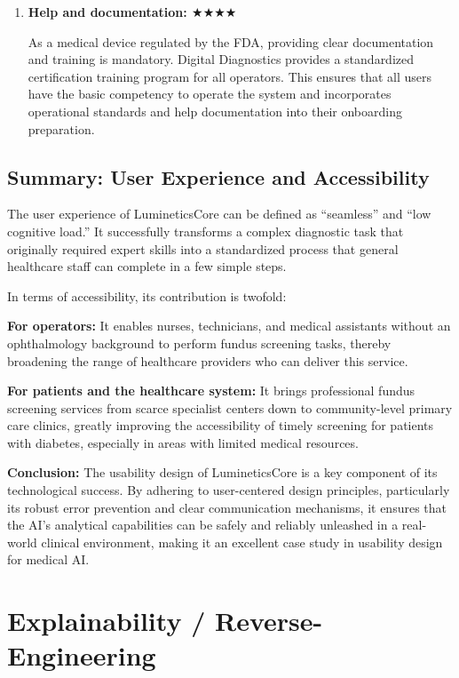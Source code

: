 \documentclass[sigplan,screen]{acmart}
\begin{document}
\begin{enumerate}
\item \textbf{Help and documentation: $\bigstar\bigstar\bigstar\bigstar$}

As a medical device regulated by the FDA, providing clear documentation and training is mandatory. Digital Diagnostics provides a standardized certification training program for all operators. This ensures that all users have the basic competency to operate the system and incorporates operational standards and help documentation into their onboarding preparation.

\end{enumerate}

\subsection{Summary: User Experience and Accessibility}

The user experience of LumineticsCore can be defined as ``seamless'' and ``low cognitive load.'' It successfully transforms a complex diagnostic task that originally required expert skills into a standardized process that general healthcare staff can complete in a few simple steps.

In terms of accessibility, its contribution is twofold:

\textbf{For operators:} It enables nurses, technicians, and medical assistants without an ophthalmology background to perform fundus screening tasks, thereby broadening the range of healthcare providers who can deliver this service.

\textbf{For patients and the healthcare system:} It brings professional fundus screening services from scarce specialist centers down to community-level primary care clinics, greatly improving the accessibility of timely screening for patients with diabetes, especially in areas with limited medical resources.

\textbf{Conclusion:} The usability design of LumineticsCore is a key component of its technological success. By adhering to user-centered design principles, particularly its robust error prevention and clear communication mechanisms, it ensures that the AI's analytical capabilities can be safely and reliably unleashed in a real-world clinical environment, making it an excellent case study in usability design for medical AI.

\section{Explainability / Reverse-Engineering}
\end{document}
